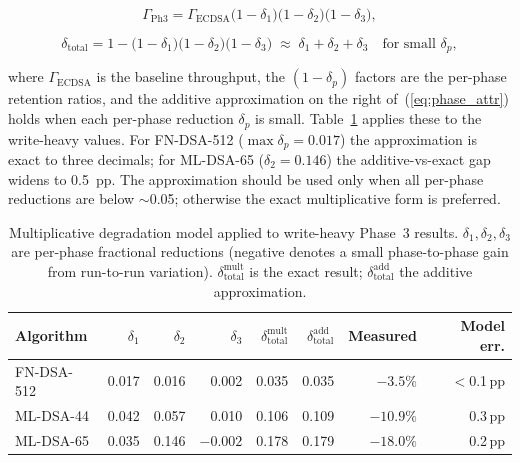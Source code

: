 \documentclass{ieeetj}
\begin{document}
\begin{equation}
\Gamma_{\mathrm{Ph3}}
= \Gamma_{\mathrm{ECDSA}}
  \bigl(1-\delta_1\bigr)\bigl(1-\delta_2\bigr)\bigl(1-\delta_3\bigr),
\label{eq:tps_degradation}
\end{equation}

\begin{equation}
\delta_{\mathrm{total}}
= 1-\bigl(1-\delta_1\bigr)\bigl(1-\delta_2\bigr)\bigl(1-\delta_3\bigr)
\;\approx\; \delta_1+\delta_2+\delta_3
\quad\text{for small }\delta_p,
\label{eq:phase_attr}
\end{equation}

where $\Gamma_{\mathrm{ECDSA}}$ is the baseline throughput, the $(1-\delta_p)$
factors are the per-phase retention ratios, and the additive approximation on the
right of~(\ref{eq:phase_attr}) holds when each per-phase reduction $\delta_p$ is
small. Table~\ref{tab:degradation_model} applies these to the write-heavy values.
For FN-DSA-512 ($\max\delta_p=0.017$) the approximation is exact to three
decimals; for ML-DSA-65 ($\delta_2=0.146$) the additive-vs-exact gap widens to
0.5~pp. The approximation should be used only when all per-phase reductions are
below $\sim$0.05; otherwise the exact multiplicative form is preferred.

\begin{table}[ht]
\centering
\caption{Multiplicative degradation model applied to write-heavy Phase~3 results.
$\delta_1,\delta_2,\delta_3$ are per-phase fractional reductions (negative
denotes a small phase-to-phase gain from run-to-run variation).
$\delta_{\mathrm{total}}^{\mathrm{mult}}$ is the exact result;
$\delta_{\mathrm{total}}^{\mathrm{add}}$ the additive approximation.}
\label{tab:degradation_model}
\setlength{\tabcolsep}{4pt}
\footnotesize
\begin{tabular}{@{}lrrrrrrr@{}}
\toprule
\textbf{Algorithm} &
\textbf{$\delta_1$} & \textbf{$\delta_2$} & \textbf{$\delta_3$} &
\textbf{$\delta_{\mathrm{total}}^{\mathrm{mult}}$} &
\textbf{$\delta_{\mathrm{total}}^{\mathrm{add}}$} &
\textbf{Measured} & \textbf{Model err.} \\
\midrule
FN-DSA-512 & 0.017 & 0.016 & 0.002 & 0.035 & 0.035 & $-3.5\%$ & $<$0.1\,pp \\
ML-DSA-44  & 0.042 & 0.057 & 0.010 & 0.106 & 0.109 & $-10.9\%$ & 0.3\,pp \\
ML-DSA-65  & 0.035 & 0.146 & $-0.002$ & 0.178 & 0.179 & $-18.0\%$ & 0.2\,pp \\
\bottomrule
\end{tabular}
\end{table}
\end{document}
